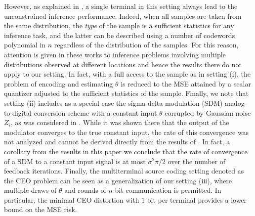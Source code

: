 \documentclass[letterpaper, conference]{IEEEtran}      %
\begin{document}
However, as explained in \cite[Sec. III]{720540}, a single terminal in this setting always lead to the unconstrained inference performance. Indeed, when all samples are taken from the same distribution, the \emph{type} of the sample \cite{csiszar1998method} is a sufficient statistics for any inference task, and the latter can be described using a number of codewords polynomial in $n$ regardless of the distribution of the samples. For this reason, attention is given in these works to inference problems involving multiple distributions observed at different locations and hence the results there do not apply to our setting. In fact, with a full access to the sample as in setting (i), the problem of encoding and estimating $\theta$ is reduced to the MSE attained by a scalar quantizer adjusted to the sufficient statistics of the sample. Finally, we note that setting (ii) includes as a special case the sigma-delta modulation (SDM) analog-to-digital conversion scheme with a constant input $\theta$ corrupted by Gaussian noise $Z_i$, as was considered in \cite{53738}. While it was shown there that the output of the modulator converges to the true constant input, the rate of this convergence was not analyzed and cannot be derived directly from the results of \cite{53738}. In fact, a corollary from the results in this paper we conclude that the rate of convergence of a SDM to a constant input signal is at most $\sigma^2\pi/2$ over the number of feedback iterations. Finally, the multiterminal source coding setting denoted as the CEO problem \cite{berger1996ceo} can be seen as a generalization of our setting (iii), where multiple draws of $\theta$ and rounds of $n$ bit communication is permitted. In particular, the minimal CEO distortion with $1$ bit per terminal provides a lower bound on the MSE risk.  \par
%
\end{document}
